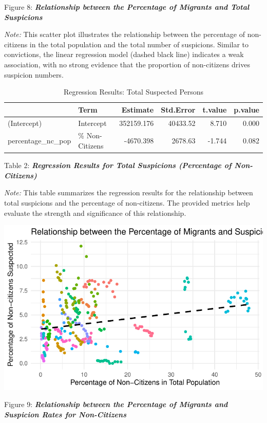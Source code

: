 \documentclass[
]{article}
\begin{document}
Figure 8: \textbf{\emph{Relationship between the Percentage of Migrants
and Total Suspicions}}

\emph{Note:} This scatter plot illustrates the relationship between the
percentage of non-citizens in the total population and the total number
of suspicions. Similar to convictions, the linear regression model
(dashed black line) indicates a weak association, with no strong
evidence that the proportion of non-citizens drives suspicion numbers.

\begin{table}
\centering
\caption{Regression Results: Total Suspected Persons}
\centering
\begin{tabular}[t]{l|l|r|r|r|r}
\hline
  & Term & Estimate & Std.Error & t.value & p.value\\
\hline
(Intercept) & Intercept & 352159.176 & 40433.52 & 8.710 & 0.000\\
\hline
percentage\_nc\_pop & \% Non-Citizens & -4670.398 & 2678.63 & -1.744 & 0.082\\
\hline
\end{tabular}
\end{table}

Table 2: \textbf{\emph{Regression Results for Total Suspicions
(Percentage of Non-Citizens)}}

\emph{Note:} This table summarizes the regression results for the
relationship between total suspicions and the percentage of
non-citizens. The provided metrics help evaluate the strength and
significance of this relationship.

\includegraphics{DataMan_Project_files/figure-pdf/unnamed-chunk-35-1.pdf}

Figure 9: \textbf{\emph{Relationship between the Percentage of Migrants
and Suspicion Rates for Non-Citizens}}
\end{document}
